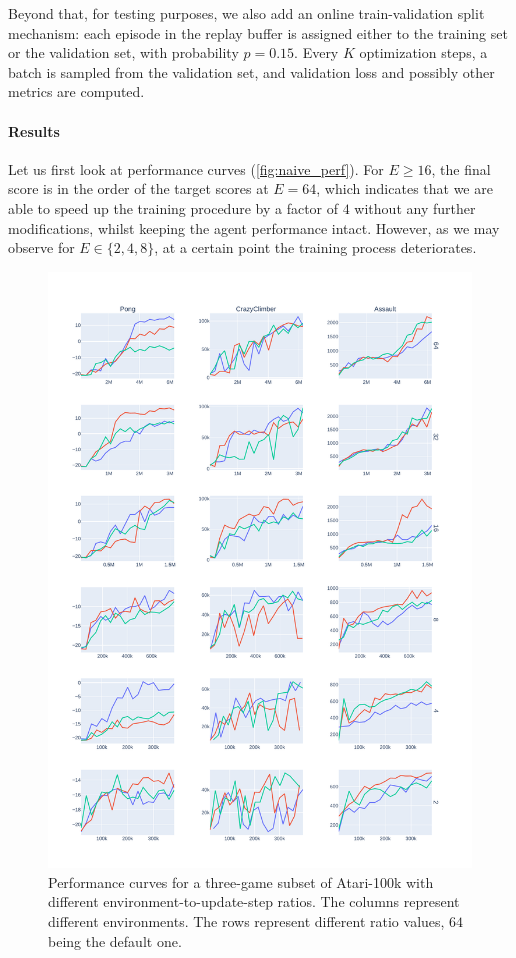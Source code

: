 \documentclass[twoside,11pt]{article}
\begin{document}
Beyond that, for testing purposes, we also add an online train-validation split mechanism: each episode in the replay buffer is assigned either to the training set or the validation set, with probability $p = 0.15$. Every $K$ optimization steps, a batch is sampled from the validation set, and validation loss and possibly other metrics are computed.

\paragraph{Results} Let us first look at performance curves (\autoref{fig:naive_perf}). For $E \geq 16$, the final score is in the order of the target scores at $E = 64$, which indicates that we are able to speed up the training procedure by a factor of $4$ without any further modifications, whilst keeping the agent performance intact. However, as we may observe for $E \in \{2, 4, 8\}$, at a certain point the training process deteriorates.

\begin{figure}
  \centering
  \includegraphics[width=0.8\linewidth,height=0.8\paperheight,keepaspectratio]{assets/naive_perf.pdf}
  \caption{Performance curves for a three-game subset of Atari-100k with different environment-to-update-step ratios. The columns represent different environments. The rows represent different ratio values, $64$ being the default one.}
  \label{fig:naive_perf}
\end{figure}
\end{document}
